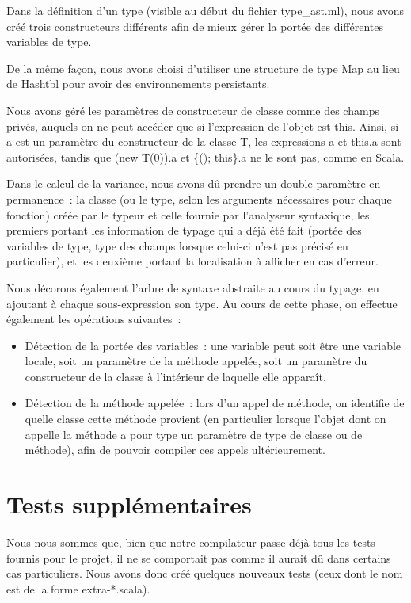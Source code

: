 \documentclass[a4paper,10pt]{article}
\newcommand{\code}[1]{{\fontfamily{pcr}\selectfont #1}}
\begin{document}
Dans la définition d'un type (visible au début du fichier
\code{type\_{}ast.ml}), nous avons créé trois constructeurs différents
afin de mieux gérer la portée des différentes variables de type.

De la même façon, nous avons choisi d'utiliser une structure de type
\code{Map} au lieu de \code{Hashtbl} pour avoir des environnements
persistants.

Nous avons géré les paramètres de constructeur de classe comme des
champs privés, auquels on ne peut accéder que si l'expression de
l'objet est \code{this}. Ainsi, si \code{a} est un paramètre du
constructeur de la classe T, les expressions \code{a} et \code{this.a}
sont autorisées, tandis que \code{(new T(0)).a} et \code{\{();
  this\}.a} ne le sont pas, comme en Scala.

Dans le calcul de la variance, nous avons dû prendre un double
paramètre en permanence~: la classe (ou le type, selon les arguments
nécessaires pour chaque fonction) créée par le typeur et celle fournie
par l'analyseur syntaxique, les premiers portant les information de
typage qui a déjà été fait (portée des variables de type, type des
champs lorsque celui-ci n'est pas précisé en particulier), et les
deuxième portant la localisation à afficher en cas d'erreur.

Nous décorons également l'arbre de syntaxe abstraite au cours du
typage, en ajoutant à chaque sous-expression son type. Au cours de
cette phase, on effectue également les opérations suivantes~:
\begin{itemize}
\item{Détection de la portée des variables~: une variable peut soit
    être une variable locale, soit un paramètre de la méthode appelée,
  soit un paramètre du constructeur de la classe à l'intérieur de
  laquelle elle apparaît.}
\item{Détection de la méthode appelée~: lors d'un appel de méthode, on
  identifie de quelle classe cette méthode provient (en particulier
  lorsque l'objet dont on appelle la méthode a pour type un paramètre
  de type de classe ou de méthode), afin de pouvoir compiler ces
  appels ultérieurement.}
\end{itemize}

\section{Tests supplémentaires}

Nous nous sommes que, bien que notre compilateur passe déjà tous les
tests fournis pour le projet, il ne se comportait pas comme il aurait
dû dans certains cas particuliers. Nous avons donc créé quelques
nouveaux tests (ceux dont le nom est de la forme \code{extra-*.scala}).
\end{document}
